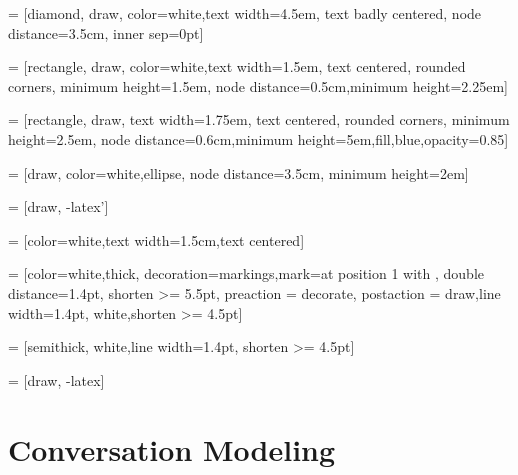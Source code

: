  = [diamond, draw, color=white,text width=4.5em, text badly centered, node distance=3.5cm, inner sep=0pt]

 = [rectangle, draw, color=white,text width=1.5em, text centered, rounded corners, minimum height=1.5em, node distance=0.5cm,minimum height=2.25em]

 = [rectangle, draw, text width=1.75em, text centered, rounded corners, minimum height=2.5em, node distance=0.6cm,minimum height=5em,fill,blue,opacity=0.85]

 = [draw, color=white,ellipse, node distance=3.5cm, minimum height=2em]

 = [draw, -latex']

 = [color=white,text width=1.5cm,text centered]

 = [color=white,thick, decoration={markings,mark=at position
	1 with {}},
double distance=1.4pt, shorten >= 5.5pt,
preaction = {decorate},
postaction = {draw,line width=1.4pt, white,shorten >= 4.5pt}]

 = [semithick, white,line width=1.4pt, shorten >= 4.5pt]

 = [draw, -latex]

\newcommand{\smallblock}[2][0,0]{%
	\node[draw,text width=1.5em, text centered, rounded corners, minimum height=1.5em, node distance=0.5cm,minimum height=2.25em] (#2) at (#1) {#2};
}


\DeclareDocumentCommand{}
\section{Conversation Modeling}

